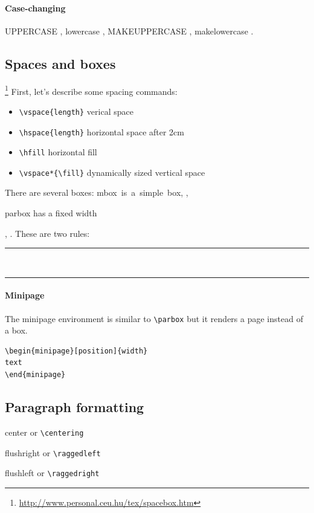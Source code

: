 \paragraph{Case-changing}
\uppercase{UpperCase \pagename}, \lowercase{LowerCase \pagename},
\MakeUppercase{MakeUppercase \pagename}, \MakeLowercase{MakeLowercase \pagename}.

\subsection{Spaces and boxes}
\footnote{\url{http://www.personal.ceu.hu/tex/spacebox.htm}}
First, let's describe some spacing commands:
\begin{itemize}
\item \lstinline$\vspace{length}$ verical space
\item \lstinline$\hspace{length}$ horizontal space \hspace{2cm} after 2cm
\item \lstinline$\hfill$ horizontal fill
\item \lstinline$\vspace*{\fill}$ dynamically sized vertical space
\end{itemize}

There are several boxes:
\mbox{mbox is a simple box},
,
\parbox{2cm}{parbox has a fixed width},
.
These are two rules:
\rule{5mm}{2mm}
\hfill \\
\rule{\linewidth}{0.3mm}

\paragraph{Minipage}
The minipage environment is similar to \lstinline$\parbox$ but it renders a page
instead of a box.

\begin{minipage}[b]{0.5\linewidth}
\begin{lstlisting}
\begin{minipage}[position]{width}
text
\end{minipage}
\end{lstlisting}
\end{minipage}

\subsection{Paragraph formatting}
\begin{center}
center or \lstinline$\centering$
\end{center}
\begin{flushright}
flushright or \lstinline$\raggedleft$
\end{flushright}
\begin{flushleft}
flushleft or \lstinline$\raggedright$
\end{flushleft}

